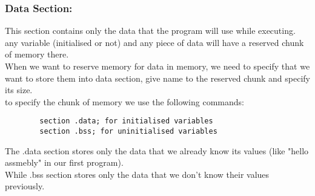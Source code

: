 \documentclass[10pt]{article}
\begin{document}
    \subsubsection{Data Section: }
    This section contains only the data that the program will use while executing. any variable (initialised or not) and any piece of data will have a reserved chunk of memory there.\\
    \tabto{20pt}When we want to reserve memory for data in memory, we need to specify that we want to store them into data section, give name to the reserved chunk and specify its size.\\
    to specify the chunk of memory we use the following commands:\\
    \begin{verbatim}
        section .data; for initialised variables
        section .bss; for uninitialised variables
    \end{verbatim}
    
    The .data section stores only the data that we already know its values (like "hello assmebly" in our first program).\\
    While .bss section stores only the data that we don't know their values previously.\\
\end{document}
